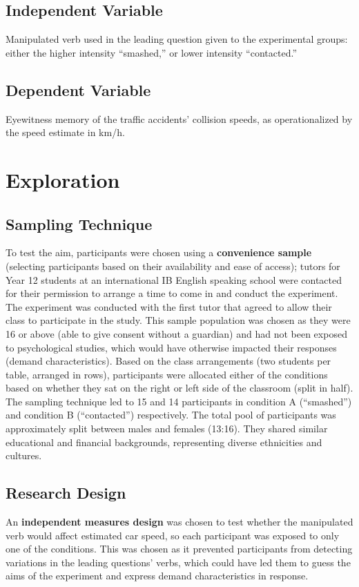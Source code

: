 \documentclass[12pt]{article}
\begin{document}
\subsection{Independent Variable}
Manipulated verb used in the leading question given to the experimental groups: either the higher intensity “smashed,” or lower intensity “contacted.” 

\subsection{Dependent Variable}
Eyewitness memory of the traffic accidents' collision speeds, as operationalized by the speed estimate in km/h. 

\pagebreak
\section{Exploration}
\subsection{Sampling Technique}
To test the aim, participants were chosen using a \textbf{convenience sample} (selecting participants based on their availability and ease of access); tutors for Year 12 students at an international IB English speaking school were contacted for their permission to arrange a time to come in and conduct the experiment. The experiment was conducted with the first tutor that agreed to allow their class to participate in the study. This sample population was chosen as they were 16 or above (able to give consent without a guardian) and had not been exposed to psychological studies, which would have otherwise impacted their responses (demand characteristics). Based on the class arrangements (two students per table, arranged in rows), participants were allocated either of the conditions based on whether they sat on the right or left side of the classroom (split in half). The sampling technique led to 15 and 14 participants in condition A (“smashed”) and condition B (“contacted”) respectively. The total pool of participants was approximately split between males and females (13:16). They shared similar educational and financial backgrounds, representing diverse ethnicities and cultures.  

\subsection{Research Design}
An \textbf{independent measures design} was chosen to test whether the manipulated verb would affect estimated car speed, so each participant was exposed to only one of the conditions. This was chosen as it prevented participants from detecting variations in the leading questions’ verbs, which could have led them to guess the aims of the experiment and express demand characteristics in response. 
\end{document}
